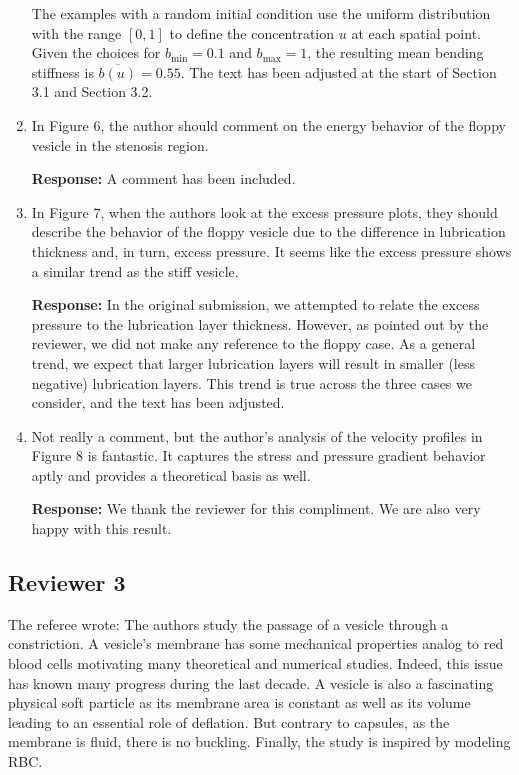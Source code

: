 \documentclass[11pt]{article}
\begin{document}
\begin{enumerate}
 The examples with a random initial condition
    use the uniform distribution with the range $[0,1]$ to define the
    concentration $u$ at each spatial point. Given the choices for
    $b_{\min}=0.1$ and $b_{\max}=1$, the resulting mean bending
    stiffness is $\overline{b(u)} = 0.55$. The text has been adjusted at
    the start of Section 3.1 and Section 3.2.

\item In Figure 6, the author should comment on the energy behavior of
  the floppy vesicle in the stenosis region.

\noindent
{\bf Response:} A comment has been included.

\item In Figure 7, when the authors look at the excess pressure plots,
  they should describe the behavior of the floppy vesicle due to the
  difference in lubrication thickness and, in turn, excess pressure. It
  seems like the excess pressure shows a similar trend as the stiff
  vesicle.

\noindent
{\bf Response:} In the original submission, we attempted to relate the
excess pressure to the lubrication layer thickness. However, as pointed
out by the reviewer, we did not make any reference to the floppy case.
As a general trend, we expect that larger lubrication layers will result
in smaller (less negative) lubrication layers. This trend is true across
the three cases we consider, and the text has been adjusted.


\item Not really a comment, but the author's analysis of the velocity
  profiles in Figure 8 is fantastic. It captures the stress and pressure
  gradient behavior aptly and provides a theoretical basis as well.

\noindent
{\bf Response:} We thank the reviewer for this compliment. We are also
very happy with this result. 


\end{enumerate}

\newpage

\subsection*{Reviewer 3}

The referee wrote: The authors study the passage of a vesicle through a
constriction. A vesicle’s membrane has some mechanical properties analog
to red blood cells motivating many theoretical and numerical studies.
Indeed, this issue has known many progress during the last decade. A
vesicle is also a fascinating physical soft particle as its membrane
area is constant as well as its volume leading to an essential role of
deflation. But contrary to capsules, as the membrane is fluid, there is
no buckling. Finally, the study is inspired by modeling RBC. 
\end{document}
